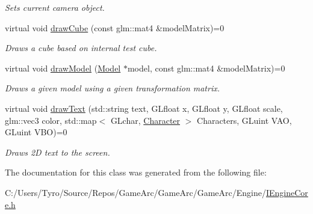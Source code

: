 \begin{DoxyCompactItemize}
\begin{DoxyCompactList}\small\item\em Sets current camera object. \end{DoxyCompactList}\item 
\mbox{\label{class_i_engine_core_af24745492d6a7c8bd410a6849fbaf854}} 
virtual void \mbox{\hyperlink{class_i_engine_core_af24745492d6a7c8bd410a6849fbaf854}{draw\+Cube}} (const glm\+::mat4 \&model\+Matrix)=0
\begin{DoxyCompactList}\small\item\em Draws a cube based on internal test cube. \end{DoxyCompactList}\item 
\mbox{\label{class_i_engine_core_a45f78f207ced5253b7323f4dcb637c2d}} 
virtual void \mbox{\hyperlink{class_i_engine_core_a45f78f207ced5253b7323f4dcb637c2d}{draw\+Model}} (\mbox{\hyperlink{class_model}{Model}} $\ast$model, const glm\+::mat4 \&model\+Matrix)=0
\begin{DoxyCompactList}\small\item\em Draws a given model using a given transformation matrix. \end{DoxyCompactList}\item 
\mbox{\label{class_i_engine_core_a4bd798d03cad0bdace8f0d08385c7236}} 
virtual void \mbox{\hyperlink{class_i_engine_core_a4bd798d03cad0bdace8f0d08385c7236}{draw\+Text}} (std\+::string text, G\+Lfloat x, G\+Lfloat y, G\+Lfloat scale, glm\+::vec3 color, std\+::map$<$ G\+Lchar, \mbox{\hyperlink{struct_character}{Character}} $>$ Characters, G\+Luint V\+AO, G\+Luint V\+BO)=0
\begin{DoxyCompactList}\small\item\em Draws 2D text to the screen. \end{DoxyCompactList}\end{DoxyCompactItemize}


The documentation for this class was generated from the following file\+:\begin{DoxyCompactItemize}
\item 
C\+:/\+Users/\+Tyro/\+Source/\+Repos/\+Game\+Arc/\+Game\+Arc/\+Game\+Arc/\+Engine/\mbox{\hyperlink{_i_engine_core_8h}{I\+Engine\+Core.\+h}}\end{DoxyCompactItemize}
